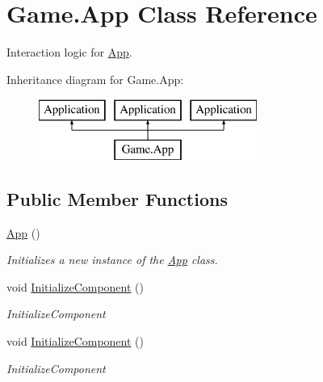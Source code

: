 \hypertarget{class_game_1_1_app}{}\section{Game.\+App Class Reference}
\label{class_game_1_1_app}


Interaction logic for \mbox{\hyperlink{class_game_1_1_app}{App}}.  


Inheritance diagram for Game.\+App\+:\begin{figure}[H]
\begin{center}
\leavevmode
\includegraphics[height=2.000000cm]{class_game_1_1_app}
\end{center}
\end{figure}
\subsection*{Public Member Functions}
\begin{DoxyCompactItemize}
\item 
\mbox{\hyperlink{class_game_1_1_app_af4bf7636234ca49dba4479bae4ddc155}{App}} ()
\begin{DoxyCompactList}\small\item\em Initializes a new instance of the \mbox{\hyperlink{class_game_1_1_app}{App}} class. \end{DoxyCompactList}\item 
void \mbox{\hyperlink{class_game_1_1_app_aebf9e516ecda0457e01ce402ca7d8f75}{Initialize\+Component}} ()
\begin{DoxyCompactList}\small\item\em Initialize\+Component \end{DoxyCompactList}\item 
void \mbox{\hyperlink{class_game_1_1_app_aebf9e516ecda0457e01ce402ca7d8f75}{Initialize\+Component}} ()
\begin{DoxyCompactList}\small\item\em Initialize\+Component \end{DoxyCompactList}\end{DoxyCompactItemize}
